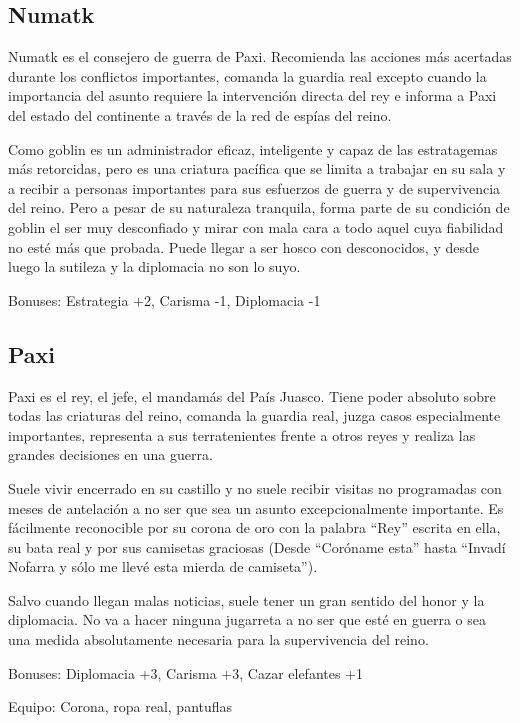 \subsection*{Numatk}

Numatk es el consejero de guerra de Paxi. Recomienda las acciones más acertadas durante los conflictos importantes, comanda la guardia real excepto cuando la importancia del asunto requiere la intervención directa del rey e informa a Paxi del estado del continente a través de la red de espías del reino. 
\par 
Como goblin es un administrador eficaz, inteligente y capaz de las estratagemas más retorcidas, pero es una criatura pacífica que se limita a trabajar en su sala y a recibir a personas importantes para sus esfuerzos de guerra y de supervivencia del reino. Pero a pesar de su naturaleza tranquila, forma parte de su condición de goblin el ser muy desconfiado y mirar con mala cara a todo aquel cuya fiabilidad no esté más que probada. Puede llegar a ser hosco con desconocidos, y desde luego la sutileza y la diplomacia no son lo suyo. 
\par 
Bonuses: Estrategia +2, Carisma -1, Diplomacia -1

\subsection*{Paxi}

Paxi es el rey, el jefe, el mandamás del País Juasco. Tiene poder absoluto sobre todas las criaturas del reino, comanda la guardia real, juzga casos especialmente importantes, representa a sus terratenientes frente a otros reyes y realiza las grandes decisiones en una guerra.
\par
Suele vivir encerrado en su castillo y no suele recibir visitas no programadas con meses de antelación a no ser que sea un asunto excepcionalmente importante. Es fácilmente reconocible por su corona de oro con la palabra ``Rey'' escrita en ella, su bata real y por sus camisetas graciosas (Desde ``Coróname esta'' hasta ``Invadí Nofarra y sólo me llevé esta mierda de camiseta''). 
\par
Salvo cuando llegan malas noticias, suele tener un gran sentido del honor y la diplomacia. No va a hacer ninguna jugarreta a no ser que esté en guerra o sea una medida absolutamente necesaria para la supervivencia del reino. 
\par
Bonuses: Diplomacia +3, Carisma +3, Cazar elefantes +1
\par 
Equipo: Corona, ropa real, pantuflas

